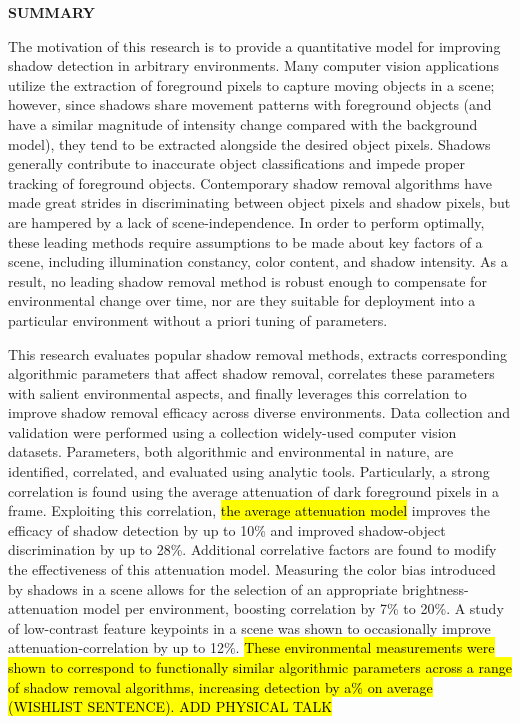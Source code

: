 \documentclass[12pt]{report}
\begin{document}
\doublespacing

\clearpage
\begin{centering}
\textbf{SUMMARY}\\
\vspace{\baselineskip}
\end{centering}

The motivation of this research is to provide a quantitative model for improving shadow detection in arbitrary environments. Many computer vision applications utilize the extraction of foreground pixels to capture moving objects in a scene; however, since shadows share movement patterns with foreground objects (and have a similar magnitude of intensity change compared with the background model), they tend to be extracted alongside the desired object pixels. Shadows generally contribute to inaccurate object classifications and impede proper tracking of foreground objects. Contemporary shadow removal algorithms have made great strides in discriminating between object pixels and shadow pixels, but are hampered by a lack of scene-independence. In order to perform optimally, these leading methods require assumptions to be made about key factors of a scene, including illumination constancy, color content, and shadow intensity. As a result, no leading shadow removal method is robust enough to compensate for environmental change over time, nor are they suitable for deployment into a particular environment without a priori tuning of parameters.

This research evaluates popular shadow removal methods, extracts corresponding algorithmic parameters that affect shadow removal, correlates these parameters with salient environmental aspects, and finally leverages this correlation to improve shadow removal efficacy across diverse environments. Data collection and validation were performed using a collection widely-used computer vision datasets. Parameters, both algorithmic and environmental in nature, are identified, correlated, and evaluated using analytic tools. Particularly, a strong correlation is found using the average attenuation of dark foreground pixels in a frame. Exploiting this correlation, \hl{the average attenuation model} improves the efficacy of shadow detection by up to 10\% and improved shadow-object discrimination by up to 28\%. Additional correlative factors are found to modify the effectiveness of this attenuation model. Measuring the color bias introduced by shadows in a scene allows for the selection of an appropriate brightness-attenuation model per environment, boosting correlation by 7\% to 20\%. A study of low-contrast feature keypoints in a scene was shown to occasionally improve attenuation-correlation by up to 12\%. \hl{These environmental measurements were shown to correspond to functionally similar algorithmic parameters across a range of shadow removal algorithms, increasing detection by a\% on average (WISHLIST SENTENCE). ADD PHYSICAL TALK}

\end{document}
